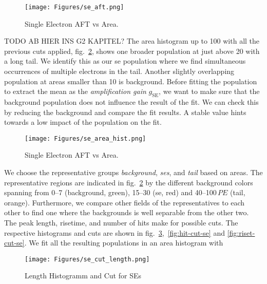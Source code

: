 \begin{figure}
    \centering
    \texttt{[image: Figures/se\_aft.png]}  %
    \caption[AFT vs Area Single Electrons]{
        Single Electron AFT vs Area.
    }
    \label{fig:se-aft}
\end{figure}

TODO AB HIER INS G2 KAPITEL?
The area histogram up to \SI{100}{} with all the previous cuts applied, fig.~\ref{fig:se-area-hist}, shows one broader population at just above \SI{20}{} with a long tail.
We identify this as our \gls{se} population where we find simultaneous occurrences of multiple electrons in the tail.
Another slightly overlapping population at areas smaller than \SI{10}{} is background.
Before fitting the population to extract the mean as the \emph{amplification gain} $ g_\mathrm{SE} $, we want to make sure that the background population does not influence the result of the fit.
We can check this by reducing the background and compare the fit results.
A stable value hints towards a low impact of the population on the fit.

\begin{figure}
    \centering
    \texttt{[image: Figures/se\_area\_hist.png]}  %
    \caption[Histogram Area Single Electrons and Background]{
        Single Electron AFT vs Area.
    }
    \label{fig:se-area-hist}
\end{figure}


We choose the representative groups \emph{background}, \emph{\glspl{se}}, and \emph{tail} based on areas.
The representative regions are indicated in fig.~\ref{fig:se-area-hist} by the different background colors spanning from \numrange{0}{7} (background, green), \numrange{15}{30} (\gls{se}, red) and \numrange{40}{100}$ \,\mathit{PE} $ (tail, orange).
Furthermore, we compare other fields of the representatives to each other to find one where the backgrounds is well separable from the other two.
The peak length, risetime, and number of hits make for possible cuts.
The respective histograms and cuts are shown in fig.~\ref{fig:len-cut-se},~\ref{fig:hit-cut-se} and \ref{fig:riset-cut-se}.
We fit all the resulting populations in an area histogram with %

\begin{figure}
    \centering
    \texttt{[image: Figures/se\_cut\_length.png]}  %
    \caption[Length Histogramm and Cut for SEs]{
        Length Histogramm and Cut for SEs
    }
    \label{fig:len-cut-se}
\end{figure}


